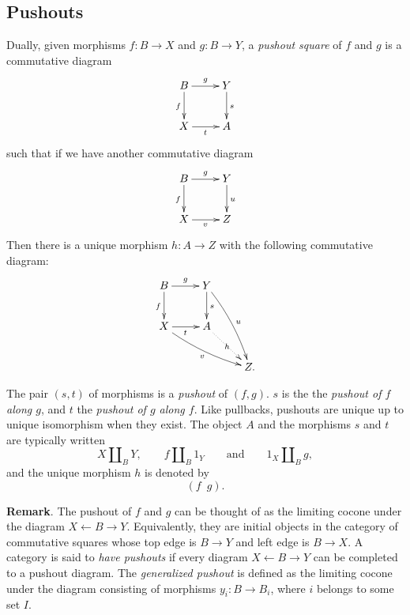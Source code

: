\documentclass[12pt]{article}
\newcommand{\from}{\leftarrow}
\begin{document}
\subsection*{Pushouts}

Dually, given morphisms $f:B\to X$ and $g:B\to Y$, a \emph{pushout square} of $f$ and $g$ is a commutative diagram
\[\xymatrix{
B\ar[d]_f \ar[r]^g & Y\ar[d]^s \\
X\ar[r]_t       & A
}\]
such that if we have another commutative diagram
\[\xymatrix{
B\ar[d]_f \ar[r]^g & Y\ar[d]^u \\
X\ar[r]_v       & Z
}\]
Then there is a unique morphism $h:A\to Z$ with the following commutative diagram:
\[\xymatrix{
B\ar[d]_f \ar[r]^g & Y\ar[d]^s \ar@/^1ex/[ddr]^u & \\
X\ar[r]_t \ar@/_1ex/[drr]_v & A \ar@{.>}[dr]|-h & \\
& & Z.
}\]

The pair $(s,t)$ of morphisms is a \emph{pushout} of $(f,g)$.  $s$ is the the \emph{pushout of $f$ along $g$}, and $t$ the \emph{pushout of $g$ along $f$}.  Like pullbacks, pushouts are unique up to unique isomorphism when they exist.  The object $A$ and the morphisms $s$ and $t$ are typically written $$X\amalg_B Y,\qquad f\amalg_B 1_Y \qquad \mbox{and} \qquad 1_X \amalg_B g,$$ and the unique morphism $h$ is denoted by $$(f \enspace g).$$

\textbf{Remark}.  The pushout of $f$ and $g$ can be thought of as the limiting cocone under the diagram $X \from B \to Y$.  Equivalently, they are initial objects in the category of commutative squares whose top edge is $B\to Y$ and left edge is $B\to X$.  A category is said to \emph{have pushouts} if every diagram $X \from B \to Y$ can be completed to a pushout diagram.  The \emph{generalized pushout} is defined as the limiting cocone under the diagram consisting of morphisms $y_i: B\to B_i$, where $i$ belongs to some set $I$.

\end{document}
